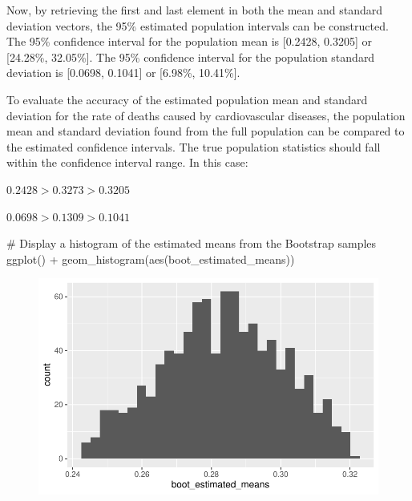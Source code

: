 \documentclass[
  letterpaper,
  DIV=11,
  numbers=noendperiod]{scrartcl}
\newenvironment{Shaded}{\begin{snugshade}}{\end{snugshade}}
\newcommand{\CommentTok}[1]{\textcolor[rgb]{0.37,0.37,0.37}{#1}}
\newcommand{\FunctionTok}[1]{\textcolor[rgb]{0.28,0.35,0.67}{#1}}
\newcommand{\NormalTok}[1]{\textcolor[rgb]{0.00,0.23,0.31}{#1}}
\newcommand{\SpecialCharTok}[1]{\textcolor[rgb]{0.37,0.37,0.37}{#1}}
\begin{document}
Now, by retrieving the first and last element in both the mean and
standard deviation vectors, the 95\% estimated population intervals can
be constructed. The 95\% confidence interval for the population mean is
{[}0.2428, 0.3205{]} or {[}24.28\%, 32.05\%{]}. The 95\% confidence
interval for the population standard deviation is {[}0.0698, 0.1041{]}
or {[}6.98\%, 10.41\%{]}.

To evaluate the accuracy of the estimated population mean and standard
deviation for the rate of deaths caused by cardiovascular diseases, the
population mean and standard deviation found from the full population
can be compared to the estimated confidence intervals. The true
population statistics should fall within the confidence interval range.
In this case:

\(0.2428 > 0.3273 > 0.3205\)

\(0.0698 > 0.1309 > 0.1041\)

\begin{Shaded}
\begin{Highlighting}[]
\CommentTok{\# Display a histogram of the estimated means from the Bootstrap samples}
\FunctionTok{ggplot}\NormalTok{() }\SpecialCharTok{+}
\FunctionTok{geom\_histogram}\NormalTok{(}\FunctionTok{aes}\NormalTok{(boot\_estimated\_means))}
\end{Highlighting}
\end{Shaded}

\begin{figure}[H]

{\centering \includegraphics{Bootstrapping-Group-Report_files/figure-pdf/unnamed-chunk-18-1.pdf}

}

\end{figure}
\end{document}
